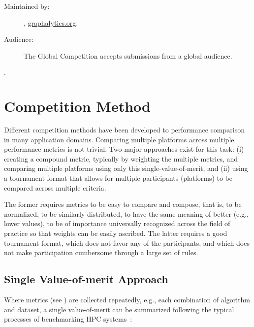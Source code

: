 \begin{description}
    \item[Maintained by:] \toolname, \url{graphalytics.org}.
    \item[Audience:] The Global \toolname{} Competition accepts submissions from a global audience.
\end{description} 



 .








\section{Competition Method} \label{sec:competitions}
Different competition methods have been developed to performance comparison in many application domains. Comparing multiple platforms across multiple performance metrics is not trivial. Two major approaches exist for this task: (i) creating a compound metric, typically by weighting the multiple metrics, and comparing multiple platforms using only this single-value-of-merit, and (ii) using a tournament format that allows for multiple participants (platforms) to be compared across multiple criteria. 

The former requires metrics to be easy to compare and compose, that is, to be normalized, to be similarly distributed, to have the same meaning of better (e.g., lower values), to be of importance universally recognized across the field of practice so that weights can be easily ascribed. The latter requires a good tournament format, which does not favor any of the participants, and which does not make participation cumbersome through a large set of rules.


\subsection{Single Value-of-merit Approach} \label{sec:competitions:single_value}
Where metrics (see ) are collected repeatedly, e.g., each combination of algorithm and dataset, a single value-of-merit can be summarized following the typical processes of benchmarking HPC systems~\cite{DBLP:conf/sc/HoeflerB15}:

